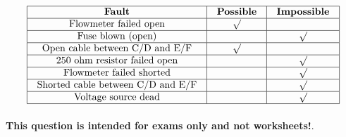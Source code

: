 






$$\vbox{\offinterlineskip
\halign{\strut
\vrule \quad\hfil # \ \hfil & 
\vrule \quad\hfil # \ \hfil & 
\vrule \quad\hfil # \ \hfil \vrule \cr
\noalign{\hrule}
%
{\bf Fault} & {\bf Possible} & {\bf Impossible} \cr
%
\noalign{\hrule}
%
Flowmeter failed open & $\surd$ &  \cr
%
\noalign{\hrule}
%
Fuse blown (open) &  & $\surd$ \cr
%
\noalign{\hrule}
%
Open cable between C/D and E/F & $\surd$ &  \cr
%
\noalign{\hrule}
%
250 ohm resistor failed open &  & $\surd$ \cr
%
\noalign{\hrule}
%
Flowmeter failed shorted &  & $\surd$ \cr
%
\noalign{\hrule}
%
Shorted cable between C/D and E/F &  & $\surd$ \cr
%
\noalign{\hrule}
%
Voltage source dead &  & $\surd$ \cr
%
\noalign{\hrule}
} %
}$$ %








{\bf This question is intended for exams only and not worksheets!}.



